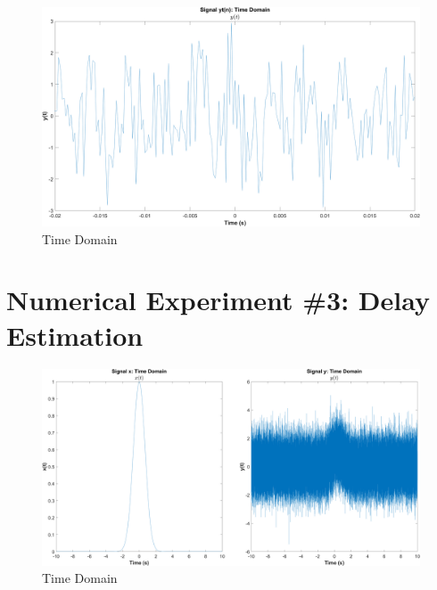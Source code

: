 \documentclass[12pt]{article}
\begin{document}

\begin{figure}[h]
	\centering
	\includegraphics[width=\textwidth]{exp2_time}
	\caption{\label{fig:exp2_time}Time Domain}
\end{figure}

\section*{Numerical Experiment \#3: Delay Estimation}


\begin{figure}[h]
	\centering
	\includegraphics[width=\textwidth]{exp3_time}
	\caption{\label{fig:exp3_time}Time Domain}
\end{figure}
\end{document}
